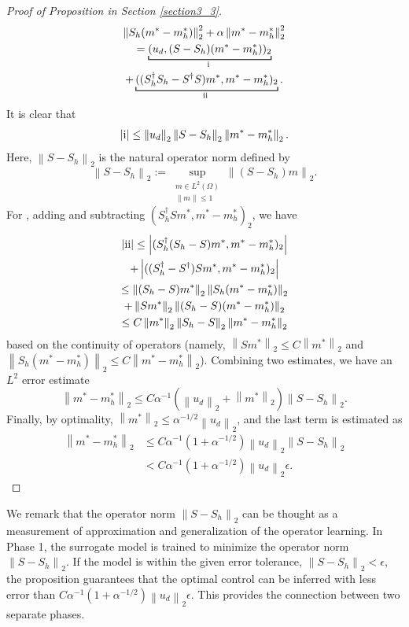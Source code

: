 \documentclass[letterpaper]{article}
\newcommand{\norm}[1]{\left\lVert#1\right\rVert}
\newcommand{\bmm}{m^*}
\newcommand{\bmmh}{m_h^*}
\newcommand{\romanone}{\uppercase\expandafter{\romannumeral1}}
\newcommand{\romantwo}{\uppercase\expandafter{\romannumeral2}}
\begin{document}
\begin{proof}[Proof of Proposition in Section \ref{section3_3}]
\begin{multline}
  \norm{S_h (\bmm - \bmmh)}_2^2 + \alpha \norm{\bmm - \bmmh}_2^2 \\
    = \underbracket[0.8pt]{(u_d, (S - S_h) (\bmm - \bmmh))_2}_\text{\clap{\romanone~}} \\
    + \underbracket[0.8pt]{((S_h^\dagger S_h - S^\dagger S)\bmm, \bmm - \bmmh)_2}_\text{\clap{\romantwo~}}. 
\end{multline}
It is clear that
\begin{equation}
  \left| \text{\romanone} \right| \leq \norm{u_d}_2 \norm{S - S_h}_2 \norm{\bmm - \bmmh}_2.
\end{equation}
Here, $\norm{S - S_h}_2$ is the natural operator norm defined by
\begin{equation} \label{opnorm}
  \norm{S - S_h}_2 := \sup_{\substack{m\in L^2(\Omega) \\ \norm{m} \leq 1}} \norm{(S-S_h) m}_2.
\end{equation}
For \romantwo, adding and subtracting $(S_h^\dagger S \bmm, \bmm - \bmmh)_2$, we have
\begin{multline}
    \left| \text{\romantwo} \right| \leq \left| (S_h^\dagger (S_h - S) \bmm, \bmm - \bmmh)_2\right| \\
    + \left| ((S_h^\dagger - S^\dagger) S \bmm, \bmm - \bmmh)_2\right| \nonumber \\
    \leq \norm{(S_h - S) \bmm}_2 \norm{S_h (\bmm - \bmmh)}_2 \\
    + \norm{S \bmm}_2 \norm{(S_h - S) (\bmm - \bmmh)}_2 \nonumber \\
    \leq C \norm{\bmm}_2 \norm{S_h - S}_2 \norm{\bmm - \bmmh}_2
\end{multline}
based on the continuity of operators (namely, $\norm{S \bmm}_2 \leq C \norm{\bmm}_2$ and $\norm{S_h (\bmm - \bmmh)}_2 \leq C \norm{\bmm - \bmmh}_2$). Combining two estimates, we have an $L^2$ error estimate
\begin{equation}
  \norm{\bmm - \bmmh}_2 \leq C \alpha^{-1} (\norm{u_d}_2 + \norm{\bmm}_2) \norm{S - S_h}_2. 
\end{equation}
Finally, by optimality, $\norm{\bmm}_2 \leq \alpha^{-1/2} \norm{u_d}_2$, and the last term is estimated as  
\begin{align}
  \norm{\bmm - \bmmh}_2 &\leq C \alpha^{-1} (1 + \alpha^{-1/2}) \norm{u_d}_2 \norm{S - S_h}_2 \nonumber \\
  &< C \alpha^{-1} (1 + \alpha^{-1/2}) \norm{u_d}_2 \epsilon.
\end{align}
\end{proof}
We remark that the operator norm $\norm{S - S_h}_2$ can be thought as a measurement of approximation and generalization of the operator learning. In Phase 1, the surrogate model is trained to minimize the operator norm $\norm{S - S_h}_2$. If the model is within the given error tolerance, $\norm{S - S_h}_2 < \epsilon$, the proposition guarantees that the optimal control can be inferred with less error than $C \alpha^{-1} (1 + \alpha^{-1/2}) \norm{u_d}_2 \epsilon$. This provides the connection between two separate phases. 
\end{document}
